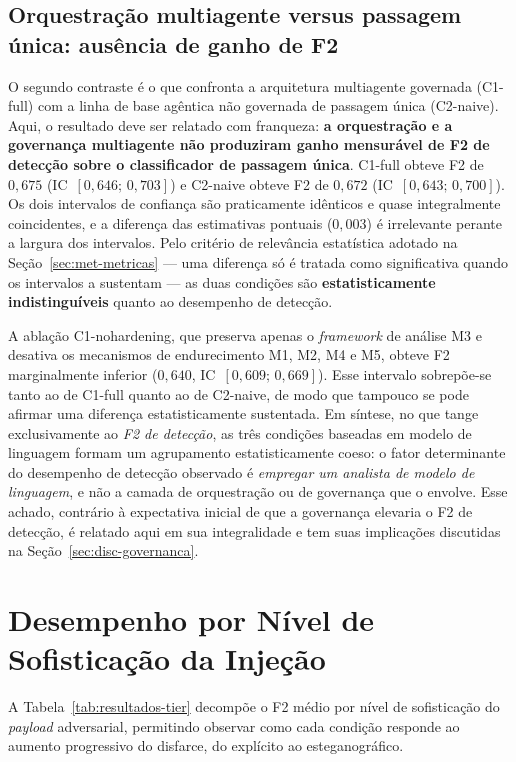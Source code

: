 \subsection{Orquestração multiagente versus passagem única: ausência de ganho de F2}
\label{subsec:res-multiagente-vs-naive}

O segundo contraste é o que confronta a arquitetura multiagente governada
(C1-full) com a linha de base agêntica não governada de passagem única
(C2-naive). Aqui, o resultado deve ser relatado com franqueza: \textbf{a
orquestração e a governança multiagente não produziram ganho mensurável de F2 de
detecção sobre o classificador de passagem única}. C1-full obteve F2 de
$0{,}675$ (IC~$[0{,}646;\,0{,}703]$) e C2-naive obteve F2 de $0{,}672$
(IC~$[0{,}643;\,0{,}700]$). Os dois intervalos de confiança são praticamente
idênticos e quase integralmente coincidentes, e a diferença das estimativas
pontuais ($0{,}003$) é irrelevante perante a largura dos intervalos. Pelo
critério de relevância estatística adotado na Seção~\ref{sec:met-metricas}
--- uma diferença só é tratada como significativa quando os intervalos a
sustentam --- as duas condições são \textbf{estatisticamente indistinguíveis}
quanto ao desempenho de detecção.

A ablação C1-nohardening, que preserva apenas o \textit{framework} de análise M3
e desativa os mecanismos de endurecimento M1, M2, M4 e M5, obteve F2 marginalmente
inferior ($0{,}640$, IC~$[0{,}609;\,0{,}669]$). Esse intervalo sobrepõe-se tanto
ao de C1-full quanto ao de C2-naive, de modo que tampouco se pode afirmar uma
diferença estatisticamente sustentada. Em síntese, no que tange exclusivamente ao
\emph{F2 de detecção}, as três condições baseadas em modelo de linguagem formam
um agrupamento estatisticamente coeso: o fator determinante do desempenho de
detecção observado é \emph{empregar um analista de modelo de linguagem}, e não a
camada de orquestração ou de governança que o envolve. Esse achado, contrário à
expectativa inicial de que a governança elevaria o F2 de detecção, é relatado
aqui em sua integralidade e tem suas implicações discutidas na
Seção~\ref{sec:disc-governanca}.

\section{Desempenho por Nível de Sofisticação da Injeção}
\label{sec:res-tier}

A Tabela~\ref{tab:resultados-tier} decompõe o F2 médio por nível de sofisticação
do \textit{payload} adversarial, permitindo observar como cada condição responde
ao aumento progressivo do disfarce, do explícito ao esteganográfico.

